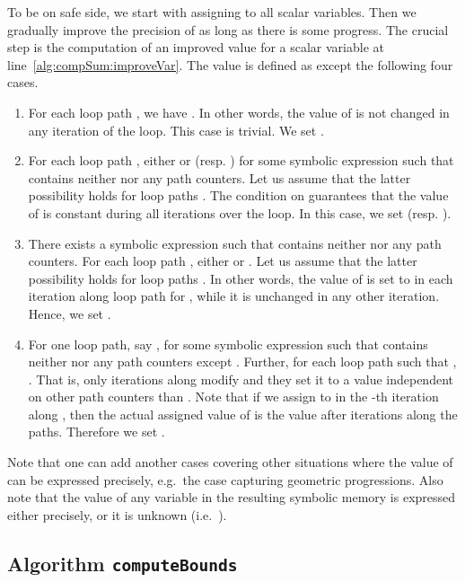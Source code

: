 \documentclass[10pt,a4paper]{article}
\begin{document}
To be on safe side, we start with  assigning 
to all scalar variables. Then we gradually improve the precision of
 as long as there is some progress. The crucial step
is the computation of an improved value  for a scalar variable 
at line~\ref{alg:compSum:improveVar}. The value  is defined as 
except the following four cases.
\begin{enumerate}
\item For each loop path , we have . In
  other words, the value of  is not changed in any iteration of the
  loop. This case is trivial. We set .
\item For each loop path , either  or
   (resp. )
  for some symbolic expression  such
  that  contains neither 
  nor any path counters. Let us assume that the latter possibility holds for
  loop paths . The condition on
   guarantees that the value of
   is constant during all iterations over the loop. In this case, we
  set 
  (resp. ).
\item There exists a symbolic expression  such that
   contains neither  nor any
  path counters. For each loop path , either
   or . Let us assume that
  the latter possibility holds for loop paths .  In
  other words, the value of  is set to  in each iteration along
  loop path  for , while it is unchanged in any other
  iteration. Hence, we set .
\item For one loop path, say ,  for some
  symbolic expression  such that 
  contains neither  nor any path counters except . Further,
  for each loop path  such that ,
  . That is, only iterations along  modify
   and they set it to a value independent on other path counters
  than . Note that if we assign  to  in the
  -th iteration along , then the actual assigned value of
   is the value after  iterations along the paths. Therefore
  we set .
\end{enumerate}
Note that one can add another cases covering other situations where the
value of  can be expressed precisely, e.g.~the case capturing
geometric progressions.  Also note that
the value of any variable in the resulting symbolic memory
 is expressed either precisely, or it is 
unknown (i.e.~).




\subsection{Algorithm \Large \texttt{computeBounds}}
 
\end{document}
